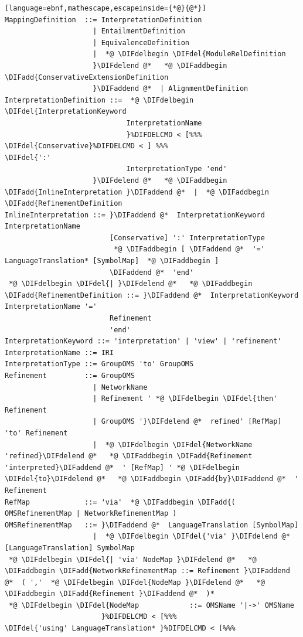 \documentclass[10pt,fleqn,final]{scrreprt}
\newenvironment{definitions}[0]{\medskip }{}
\providecommand{\DIFadd}[1]{{\protect\color{blue}\uwave{#1}}} %
\providecommand{\DIFdel}[1]{{\protect\color{red}\sout{#1}}}                      %
\providecommand{\DIFaddbegin}{} %
\providecommand{\DIFaddend}{} %
\providecommand{\DIFdelbegin}{} %
\providecommand{\DIFdelend}{} %
\begin{document}
\begin{definitions}
\begin{lstlisting}[language=ebnf,mathescape,escapeinside={*@}{@*}]
MappingDefinition  ::= InterpretationDefinition
                     | EntailmentDefinition
                     | EquivalenceDefinition
                     |  *@ \DIFdelbegin \DIFdel{ModuleRelDefinition
                     }\DIFdelend @*   *@ \DIFaddbegin \DIFadd{ConservativeExtensionDefinition
                     }\DIFaddend @*  | AlignmentDefinition
InterpretationDefinition ::=  *@ \DIFdelbegin \DIFdel{InterpretationKeyword
                             InterpretationName
                             }%DIFDELCMD < [%%%
\DIFdel{Conservative}%DIFDELCMD < ] %%%
\DIFdel{':'
                             InterpretationType 'end'
                     }\DIFdelend @*   *@ \DIFaddbegin \DIFadd{InlineInterpretation }\DIFaddend @*  |  *@ \DIFaddbegin \DIFadd{RefinementDefinition
InlineInterpretation ::= }\DIFaddend @*  InterpretationKeyword InterpretationName
                         [Conservative] ':' InterpretationType
                          *@ \DIFaddbegin [ \DIFaddend @*  '=' LanguageTranslation* [SymbolMap]  *@ \DIFaddbegin ]
                         \DIFaddend @*  'end'
 *@ \DIFdelbegin \DIFdel{| }\DIFdelend @*   *@ \DIFaddbegin \DIFadd{RefinementDefinition ::= }\DIFaddend @*  InterpretationKeyword InterpretationName '='
                         Refinement
                         'end'
InterpretationKeyword ::= 'interpretation' | 'view' | 'refinement'
InterpretationName ::= IRI
InterpretationType ::= GroupOMS 'to' GroupOMS
Refinement         ::= GroupOMS
                     | NetworkName
                     | Refinement ' *@ \DIFdelbegin \DIFdel{then' Refinement
                     | GroupOMS '}\DIFdelend @*  refined' [RefMap] 'to' Refinement
                     |  *@ \DIFdelbegin \DIFdel{NetworkName 'refined}\DIFdelend @*   *@ \DIFaddbegin \DIFadd{Refinement 'interpreted}\DIFaddend @*  ' [RefMap] ' *@ \DIFdelbegin \DIFdel{to}\DIFdelend @*   *@ \DIFaddbegin \DIFadd{by}\DIFaddend @*  ' Refinement
RefMap             ::= 'via'  *@ \DIFaddbegin \DIFadd{( OMSRefinementMap | NetworkRefinementMap )
OMSRefinementMap   ::= }\DIFaddend @*  LanguageTranslation [SymbolMap]
                     |  *@ \DIFdelbegin \DIFdel{'via' }\DIFdelend @*  [LanguageTranslation] SymbolMap
 *@ \DIFdelbegin \DIFdel{| 'via' NodeMap }\DIFdelend @*   *@ \DIFaddbegin \DIFadd{NetworkRefinementMap ::= Refinement }\DIFaddend @*  ( ','  *@ \DIFdelbegin \DIFdel{NodeMap }\DIFdelend @*   *@ \DIFaddbegin \DIFadd{Refinement }\DIFaddend @*  )*
 *@ \DIFdelbegin \DIFdel{NodeMap            ::= OMSName '|->' OMSName
                       }%DIFDELCMD < [%%%
\DIFdel{'using' LanguageTranslation* }%DIFDELCMD < [%%%

\end{lstlisting}
\end{definitions}
\end{document}
